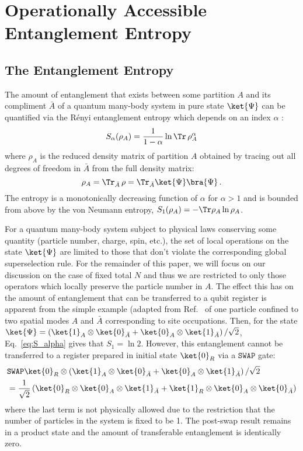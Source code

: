 \section{Operationally Accessible Entanglement Entropy}

\subsection{The \ren Entanglement Entropy}

The amount of entanglement that exists between some partition $A$ and its compliment $\bar{A}$ of a quantum many-body system in pure state $\ket{\Psi}$ can be quantified via the R\'{e}nyi entanglement entropy which depends on an index $\alpha$ :
%
\begin{equation}
S_{\alpha} (\rho_A) = \frac{1}{1-\alpha}\ln \Tr\, \rho_A^{\alpha}
\label{eq:S_alpha}
\end{equation}
%
where $\rho_{A}$ is the reduced density matrix of partition $A$ obtained by
tracing out all degrees of freedom in $\bar{A}$ from the full density matrix:
%
\begin{equation}
\rho_{A} = \Tr_{\bar{A}}\, \rho = \Tr_{\bar{A}} \ket{\Psi}\bra{\Psi}\,.
\end{equation}
%
The \ren entropy is a monotonically decreasing function of $\alpha$ for $\alpha
> 1$ and is bounded from above by the von Neumann entropy, $S_1(\rho_A) = -\Tr \rho_A \ln \rho_A$.

For a quantum many-body system subject to physical laws conserving some quantity (particle number, charge, spin, etc.), the set of local operations on the state $\ket{\Psi}$ are limited to those that don't violate the corresponding global superselection rule.  For the remainder of this paper, we will focus on our discussion on the case of fixed total $N$ and thus we are restricted to only those operators which locally preserve the particle number in $A$.  The effect this has on the amount of entanglement that can be transferred to a qubit register is apparent from the simple example (adapted from Ref.~ of one particle confined to two spatial modes $A$ and $\bar{A}$ corresponding to site occupations.  Then, for the state $\ket{\Psi} = \left(\ket{1}_A \otimes \ket{0}_{\bar{A}} + \ket{0}_A \otimes \ket{1}_{\bar{A}} \right)/\sqrt{2}$, Eq.~\eqref{eq:S_alpha} gives that $S_1 = \ln 2$. However, this entanglement cannot be transferred to a register prepared in initial state $\ket{0}_R$ via a $\texttt{SWAP}$ gate:
\begin{align*}
    & \texttt{SWAP} \ket{0}_R\otimes\left(\ket{1}_A \otimes
    \ket{0}_{\bar{A}} + \ket{0}_A \otimes \ket{1}_{\bar{A}} \right)/\sqrt{2} \\
    &= \frac{1}{\sqrt{2}}\left( \ket{0}_R \otimes \ket{0}_A \otimes
        \ket{1}_{\bar{A}} + \ket{1}_R \otimes \ket{0}_A \otimes
    \ket{0}_{\bar{A}} \right)
\end{align*}
where the last term is not physically allowed due to the restriction that the number of particles in the system is fixed to be 1. The post-swap result remains in a product state and the amount of transferable entanglement is identically zero.

